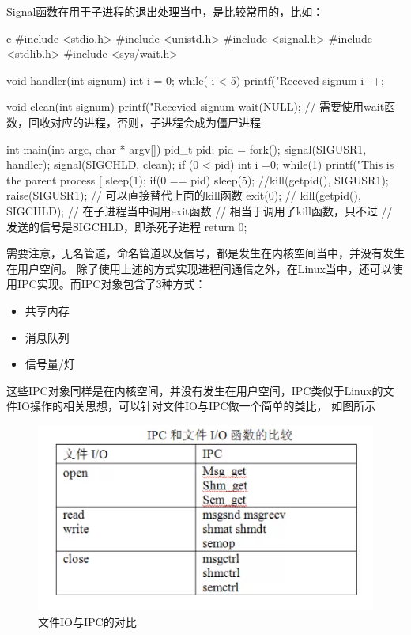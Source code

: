 Signal函数在用于子进程的退出处理当中，是比较常用的，比如：
\begin{code-block}{c}
#include <stdio.h>
#include <unistd.h>
#include <signal.h>
#include <stdlib.h>
#include <sys/wait.h>

void handler(int signum)
{
        int i = 0;
        while( i < 5)
        {
                printf("Receved signum %
                i++;
        }
}

void clean(int signum)
{
        printf("Recevied signum %
        wait(NULL); // 需要使用wait函数，回收对应的进程，否则，子进程会成为僵尸进程
}

int main(int argc, char * argv[])
{
        pid_t pid;
        pid = fork();
        signal(SIGUSR1, handler);
        signal(SIGCHLD, clean);
        if (0 < pid)
        {
                int i =0;
                while(1)
                {
                        printf("This is the parent process [%
                        sleep(1);
                }
        }
        if(0 == pid)
        {
                sleep(5);
                //kill(getpid(), SIGUSR1);
                raise(SIGUSR1); // 可以直接替代上面的kill函数
                exit(0); // kill(getpid(), SIGCHLD); // 在子进程当中调用exit函数
                                                     // 相当于调用了kill函数，只不过
                                                     // 发送的信号是SIGCHLD，即杀死子进程
        }
        return 0;
}
\end{code-block}

需要注意，无名管道，命名管道以及信号，都是发生在内核空间当中，并没有发生在用户空间。
除了使用上述的方式实现进程间通信之外，在Linux当中，还可以使用IPC实现。而IPC对象包含了3种方式：
\begin{itemize}
  \item 共享内存
  \item 消息队列
  \item 信号量/灯
\end{itemize}

这些IPC对象同样是在内核空间，并没有发生在用户空间，IPC类似于Linux的文件IO操作的相关思想，可以针对文件IO与IPC做一个简单的类比，
如图所示
\begin{figure}[H]
  \centering
  \includegraphics[scale=0.8]{IPC.png}
  \caption{文件IO与IPC的对比}
  \label{fig:IPC}
\end{figure}

